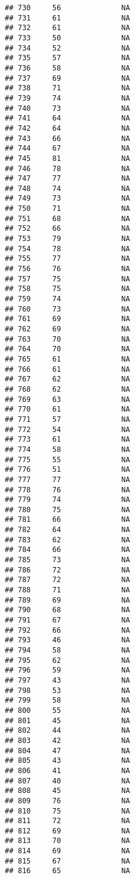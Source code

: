 \documentclass[]{article}
\begin{document}
\begin{verbatim}
## 730     56              NA
## 731     61              NA
## 732     61              NA
## 733     50              NA
## 734     52              NA
## 735     57              NA
## 736     58              NA
## 737     69              NA
## 738     71              NA
## 739     74              NA
## 740     73              NA
## 741     64              NA
## 742     64              NA
## 743     66              NA
## 744     67              NA
## 745     81              NA
## 746     78              NA
## 747     77              NA
## 748     74              NA
## 749     73              NA
## 750     71              NA
## 751     68              NA
## 752     66              NA
## 753     79              NA
## 754     78              NA
## 755     77              NA
## 756     76              NA
## 757     75              NA
## 758     75              NA
## 759     74              NA
## 760     73              NA
## 761     69              NA
## 762     69              NA
## 763     70              NA
## 764     70              NA
## 765     61              NA
## 766     61              NA
## 767     62              NA
## 768     62              NA
## 769     63              NA
## 770     61              NA
## 771     57              NA
## 772     54              NA
## 773     61              NA
## 774     58              NA
## 775     55              NA
## 776     51              NA
## 777     77              NA
## 778     76              NA
## 779     74              NA
## 780     75              NA
## 781     66              NA
## 782     64              NA
## 783     62              NA
## 784     66              NA
## 785     73              NA
## 786     72              NA
## 787     72              NA
## 788     71              NA
## 789     69              NA
## 790     68              NA
## 791     67              NA
## 792     66              NA
## 793     46              NA
## 794     58              NA
## 795     62              NA
## 796     59              NA
## 797     43              NA
## 798     53              NA
## 799     58              NA
## 800     55              NA
## 801     45              NA
## 802     44              NA
## 803     42              NA
## 804     47              NA
## 805     43              NA
## 806     41              NA
## 807     40              NA
## 808     45              NA
## 809     76              NA
## 810     75              NA
## 811     72              NA
## 812     69              NA
## 813     70              NA
## 814     69              NA
## 815     67              NA
## 816     65              NA

\end{verbatim}
\end{document}
